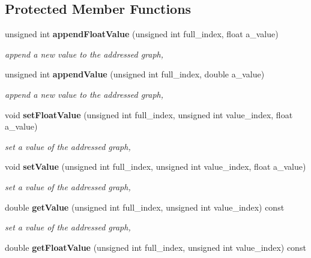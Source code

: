 \subsection*{Protected Member Functions}
\begin{DoxyCompactItemize}
\item 
unsigned int {\bf appendFloatValue} (unsigned int full\_\-index, float a\_\-value)\label{classhistmgr_1_1GraphCollection__t_a28fd99da38b507b16d24dff9e7b6b1eb}

\begin{DoxyCompactList}\small\item\em append a new value to the addressed graph, \item\end{DoxyCompactList}\item 
unsigned int {\bf appendValue} (unsigned int full\_\-index, double a\_\-value)\label{classhistmgr_1_1GraphCollection__t_a28ab4fba47b05ef353dd81c76ee4b1b3}

\begin{DoxyCompactList}\small\item\em append a new value to the addressed graph, \item\end{DoxyCompactList}\item 
void {\bf setFloatValue} (unsigned int full\_\-index, unsigned int value\_\-index, float a\_\-value)\label{classhistmgr_1_1GraphCollection__t_a2768ffebabe6eb28b985a622697d263e}

\begin{DoxyCompactList}\small\item\em set a value of the addressed graph, \item\end{DoxyCompactList}\item 
void {\bf setValue} (unsigned int full\_\-index, unsigned int value\_\-index, float a\_\-value)\label{classhistmgr_1_1GraphCollection__t_afe1fbbf9ce02123a6f0d13af1ccf48ab}

\begin{DoxyCompactList}\small\item\em set a value of the addressed graph, \item\end{DoxyCompactList}\item 
double {\bf getValue} (unsigned int full\_\-index, unsigned int value\_\-index) const \label{classhistmgr_1_1GraphCollection__t_a85dd0752c73cfdd78909e1e3e7e55cbf}

\begin{DoxyCompactList}\small\item\em set a value of the addressed graph, \item\end{DoxyCompactList}\item 
double {\bf getFloatValue} (unsigned int full\_\-index, unsigned int value\_\-index) const \label{classhistmgr_1_1GraphCollection__t_a55ab641e3179a97e4d609deea290eb37}


\end{DoxyCompactItemize}
